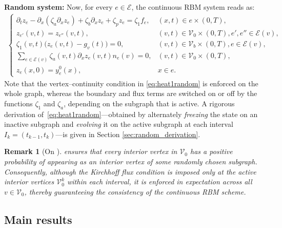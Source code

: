 \documentclass[10pt,a4paper]{amsart}
\newtheorem{remark}{Remark}[section]
\begin{document}
\noindent
{\bf Random system:} Now, for every $e\in\mathcal{E}$, the continuous RBM system reads as:
\begin{align}\label{eq:heat1random}
\begin{cases}
\partial_t z_e - \partial_x(\zeta_a\partial_x z_e) + \zeta_b\partial_x z_e + \zeta_p z_e = \zeta_1 f_e, & (x,t)\in e\times(0,T), \\
z_{e'}(v,t)=z_{e''}(v,t), & (v,t)\in\mathcal{V}_0\times(0,T), e',e''\in\mathcal{E}(v), \\
\zeta_1(v,t)\bigl(z_e(v,t)-g_v(t)\bigr)=0, & (v,t)\in\mathcal{V}_b\times(0,T),e\in\mathcal{E}(v), \\
\sum_{e\in\mathcal{E}(v)}\zeta_a(v,t)\partial_x z_e(v,t)n_e(v)=0, & (v,t)\in\mathcal{V}_0\times(0,T), \\
z_e(x,0)=y_e^0(x), & x\in e.
\end{cases}
\end{align}
Note that the vertex–continuity condition in \eqref{eq:heat1random} is enforced on the whole graph, whereas the boundary and flux terms are switched on or off by the functions $\zeta_1$ and $\zeta_a$, depending on the subgraph that is active. A rigorous derivation of~\eqref{eq:heat1random}—obtained by alternately \emph{freezing} the state on an inactive subgraph and \emph{evolving} it on the active subgraph at each interval $I_k=(t_{k-1},t_k)$—is given in Section \ref{sec:random_derivation}.

\begin{remark}[On ]
 ensures that every interior vertex in $\mathcal{V}_0$ has a positive probability of appearing as an interior vertex of some randomly chosen subgraph. Consequently, although the Kirchhoff flux condition is imposed only at the active interior vertices $\mathcal V_0^k$ within each interval, it is enforced in expectation across all $v\in\mathcal V_0$, thereby guaranteeing the consistency of the continuous RBM scheme.
\end{remark}

\subsection{Main results}
\end{document}
